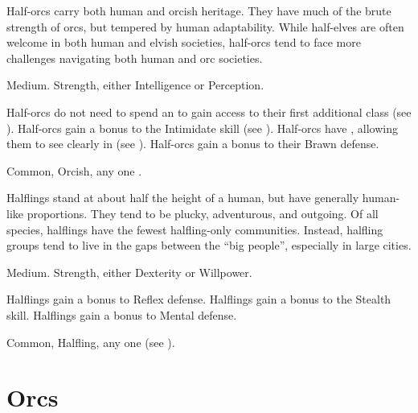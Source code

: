
  Half-orcs carry both human and orcish heritage.
  They have much of the brute strength of orcs, but tempered by human adaptability.
  While half-elves are often welcome in both human and elvish societies, half-orcs tend to face more challenges navigating both human and orc societies.

   Medium.
    Strength, either  Intelligence or  Perception.
  \begin{raggeditemize}
     Half-orcs do not need to spend an  to gain access to their first additional class (see ).
     Half-orcs gain a  bonus to the Intimidate skill (see ).
     Half-orcs have , allowing them to see clearly in  (see ).
     Half-orcs gain a  bonus to their Brawn defense.
  \end{raggeditemize}
   Common, Orcish, any one .


  Halflings stand at about half the height of a human, but have generally human-like proportions.
  They tend to be plucky, adventurous, and outgoing.
  Of all species, halflings have the fewest halfling-only communities.
  Instead, halfling groups tend to live in the gaps between the ``big people'', especially in large cities.

   Medium.
    Strength, either  Dexterity or  Willpower.
  \begin{raggeditemize}
     Halflings gain a  bonus to Reflex defense.
     Halflings gain a  bonus to the Stealth skill.
     Halflings gain a  bonus to Mental defense.
  \end{raggeditemize}
   Common, Halfling, any one  (see ).

\section{Orcs}


